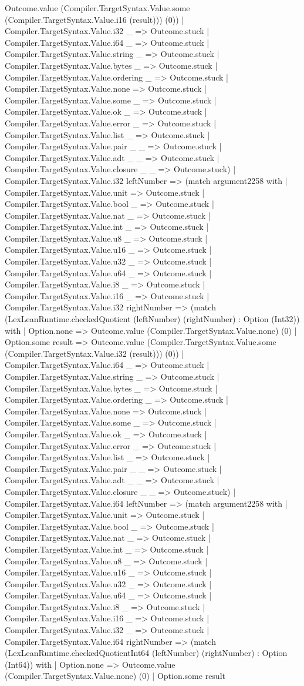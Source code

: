 \documentclass[11pt]{article}
\begin{document}
Outcome.value (Compiler.TargetSyntax.Value.some (Compiler.TargetSyntax.Value.i16 (result))) (0)) | Compiler.TargetSyntax.Value.i32 \_ => Outcome.stuck | Compiler.TargetSyntax.Value.i64 \_ => Outcome.stuck | Compiler.TargetSyntax.Value.string \_ => Outcome.stuck | Compiler.TargetSyntax.Value.bytes \_ => Outcome.stuck | Compiler.TargetSyntax.Value.ordering \_ => Outcome.stuck | Compiler.TargetSyntax.Value.none => Outcome.stuck | Compiler.TargetSyntax.Value.some \_ => Outcome.stuck | Compiler.TargetSyntax.Value.ok \_ => Outcome.stuck | Compiler.TargetSyntax.Value.error \_ => Outcome.stuck | Compiler.TargetSyntax.Value.list \_ => Outcome.stuck | Compiler.TargetSyntax.Value.pair \_ \_ => Outcome.stuck | Compiler.TargetSyntax.Value.adt \_ \_ => Outcome.stuck | Compiler.TargetSyntax.Value.closure \_ \_ => Outcome.stuck) | Compiler.TargetSyntax.Value.i32 leftNumber => (match argument2258 with | Compiler.TargetSyntax.Value.unit => Outcome.stuck | Compiler.TargetSyntax.Value.bool \_ => Outcome.stuck | Compiler.TargetSyntax.Value.nat \_ => Outcome.stuck | Compiler.TargetSyntax.Value.int \_ => Outcome.stuck | Compiler.TargetSyntax.Value.u8 \_ => Outcome.stuck | Compiler.TargetSyntax.Value.u16 \_ => Outcome.stuck | Compiler.TargetSyntax.Value.u32 \_ => Outcome.stuck | Compiler.TargetSyntax.Value.u64 \_ => Outcome.stuck | Compiler.TargetSyntax.Value.i8 \_ => Outcome.stuck | Compiler.TargetSyntax.Value.i16 \_ => Outcome.stuck | Compiler.TargetSyntax.Value.i32 rightNumber => (match (LexLeanRuntime.checkedQuotient (leftNumber) (rightNumber) : Option (Int32)) with | Option.none => Outcome.value (Compiler.TargetSyntax.Value.none) (0) | Option.some result => Outcome.value (Compiler.TargetSyntax.Value.some (Compiler.TargetSyntax.Value.i32 (result))) (0)) | Compiler.TargetSyntax.Value.i64 \_ => Outcome.stuck | Compiler.TargetSyntax.Value.string \_ => Outcome.stuck | Compiler.TargetSyntax.Value.bytes \_ => Outcome.stuck | Compiler.TargetSyntax.Value.ordering \_ => Outcome.stuck | Compiler.TargetSyntax.Value.none => Outcome.stuck | Compiler.TargetSyntax.Value.some \_ => Outcome.stuck | Compiler.TargetSyntax.Value.ok \_ => Outcome.stuck | Compiler.TargetSyntax.Value.error \_ => Outcome.stuck | Compiler.TargetSyntax.Value.list \_ => Outcome.stuck | Compiler.TargetSyntax.Value.pair \_ \_ => Outcome.stuck | Compiler.TargetSyntax.Value.adt \_ \_ => Outcome.stuck | Compiler.TargetSyntax.Value.closure \_ \_ => Outcome.stuck) | Compiler.TargetSyntax.Value.i64 leftNumber => (match argument2258 with | Compiler.TargetSyntax.Value.unit => Outcome.stuck | Compiler.TargetSyntax.Value.bool \_ => Outcome.stuck | Compiler.TargetSyntax.Value.nat \_ => Outcome.stuck | Compiler.TargetSyntax.Value.int \_ => Outcome.stuck | Compiler.TargetSyntax.Value.u8 \_ => Outcome.stuck | Compiler.TargetSyntax.Value.u16 \_ => Outcome.stuck | Compiler.TargetSyntax.Value.u32 \_ => Outcome.stuck | Compiler.TargetSyntax.Value.u64 \_ => Outcome.stuck | Compiler.TargetSyntax.Value.i8 \_ => Outcome.stuck | Compiler.TargetSyntax.Value.i16 \_ => Outcome.stuck | Compiler.TargetSyntax.Value.i32 \_ => Outcome.stuck | Compiler.TargetSyntax.Value.i64 rightNumber => (match (LexLeanRuntime.checkedQuotientInt64 (leftNumber) (rightNumber) : Option (Int64)) with | Option.none => Outcome.value (Compiler.TargetSyntax.Value.none) (0) | Option.some result 
\end{document}
